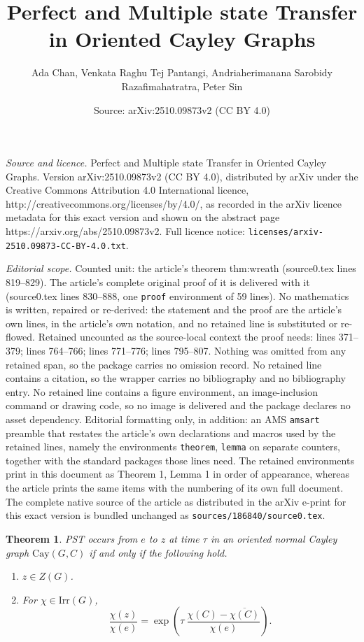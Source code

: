 \documentclass[10pt,a4paper]{amsart}
\title{Perfect and Multiple state Transfer in Oriented Cayley Graphs}
\author{Ada Chan, Venkata Raghu Tej Pantangi, Andriaherimanana Sarobidy Razafimahatratra, Peter Sin}
\date{Source: arXiv:2510.09873v2 (CC BY 4.0)}
\newtheorem{theorem}{Theorem}
\newcommand{\irr}{\mathrm{Irr}}
\newcommand{\mrm}{\mathrm}
\newcommand{\ov}{\overline}
\begin{document}
\maketitle

\noindent\emph{Source and licence.} Perfect and Multiple state Transfer in Oriented Cayley Graphs. Version arXiv:2510.09873v2 (CC BY 4.0), distributed by arXiv under the Creative Commons Attribution 4.0 International licence, http://creativecommons.org/licenses/by/4.0/, as recorded in the arXiv licence metadata for this exact version and shown on the abstract page https://arxiv.org/abs/2510.09873v2. Full licence notice: \texttt{licenses/arxiv-2510.09873-CC-BY-4.0.txt}.\par\smallskip

\noindent\textit{Editorial scope.} Counted unit: the article's theorem thm:wreath (source0.tex lines 819--829). The article's complete original proof of it is delivered with it (source0.tex lines 830--888, one \texttt{proof} environment of 59 lines). No mathematics is written, repaired or re-derived: the statement and the proof are the article's own lines, in the article's own notation, and no retained line is substituted or re-flowed.  Retained uncounted as the source-local context the proof needs: lines 371--379; lines 764--766; lines 771--776; lines 795--807.  Nothing was omitted from any retained span, so the package carries no omission record.  No retained line contains a citation, so the wrapper carries no bibliography and no bibliography entry.  No retained line contains a figure environment, an image-inclusion command or drawing code, so no image is delivered and the package declares no asset dependency.  Editorial formatting only, in addition: an AMS \texttt{amsart} preamble that restates the article's own declarations and macros used by the retained lines, namely the environments \texttt{theorem}, \texttt{lemma} on separate counters, together with the standard packages those lines need.  The retained environments print in this document as Theorem 1, Lemma 1 in order of appearance, whereas the article prints the same items with the numbering of its own full document.  The complete native source of the article as distributed in the arXiv e-print for this exact version is bundled unchanged as \texttt{sources/186840/source0.tex}.
\begin{theorem}\label{thm:characterization}
PST occurs  from $e$ to $z$ at time $\tau$ in an oriented normal Cayley graph $\mrm{Cay}(G, C)$ if and only if the following hold.
\begin{enumerate}
\item $z\in Z(G)$.
\item \label{Cond:chi}
For $\chi \in \irr(G)$,
\[\dfrac{\chi(z)}{\chi(e)}=  \exp\left({\tau\ \dfrac{\chi(C)-\ov{\chi(C)}}{\chi(e)}}\right).\]
\end{enumerate}
\end{theorem}  
\end{document}

